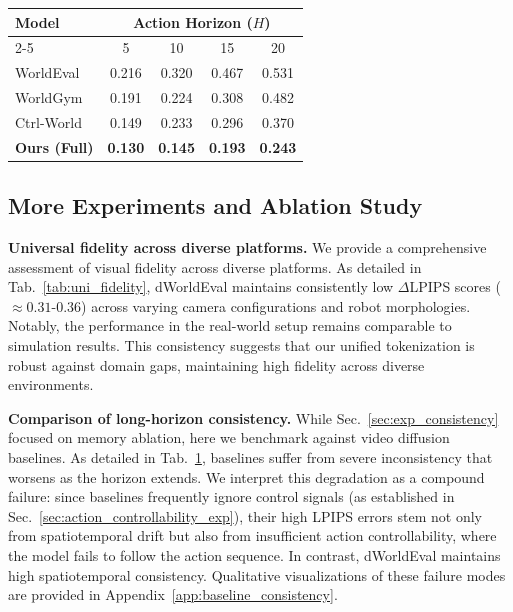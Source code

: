 \begin{table}[t]
\begin{minipage}[t]{0.46\textwidth}
        \label{tab:baseline_consistency_full}
        \begin{sc}
            \begin{tabular}{lcccc}
                \toprule
                \multirow{2}{*}{Model} & \multicolumn{4}{c}{Action Horizon ($H$)} \\
                \cmidrule(lr){2-5}
                 & 5 & 10 & 15 & 20 \\
                \midrule
                WorldEval    & 0.216 & 0.320 & 0.467 & 0.531 \\
                WorldGym   & 0.191 & 0.224 & 0.308 & 0.482 \\
                Ctrl-World   & 0.149 & 0.233 & 0.296 & 0.370 \\
                \textbf{Ours (Full)} & \textbf{0.130} & \textbf{0.145} & \textbf{0.193} & \textbf{0.243} \\
                \bottomrule
            \end{tabular}
        \end{sc}
    \end{minipage}
\end{table}



\subsection{More Experiments and Ablation Study}
\label{sec:more_experiments}

\textbf{Universal fidelity across diverse platforms.} 
We provide a comprehensive assessment of visual fidelity across diverse platforms.
As detailed in Tab.~\ref{tab:uni_fidelity}, dWorldEval maintains consistently low $\Delta$LPIPS scores ($\approx 0.31$-$0.36$) across varying camera configurations and robot morphologies. 
Notably, the performance in the real-world setup remains comparable to simulation results. This consistency suggests that our unified tokenization is robust against domain gaps, maintaining high fidelity across diverse environments.


\textbf{Comparison of long-horizon consistency.} While Sec.~\ref{sec:exp_consistency} focused on memory ablation, here we benchmark against video diffusion baselines.
As detailed in Tab.~\ref{tab:baseline_consistency_full}, baselines suffer from severe inconsistency that worsens as the horizon extends.
We interpret this degradation as a compound failure: since baselines frequently ignore control signals (as established in Sec.~\ref{sec:action_controllability_exp}), their high LPIPS errors stem not only from spatiotemporal drift but also from insufficient action controllability, where the model fails to follow the action sequence.
In contrast, dWorldEval maintains high spatiotemporal consistency. Qualitative visualizations of these failure modes are provided in Appendix~\ref{app:baseline_consistency}.


